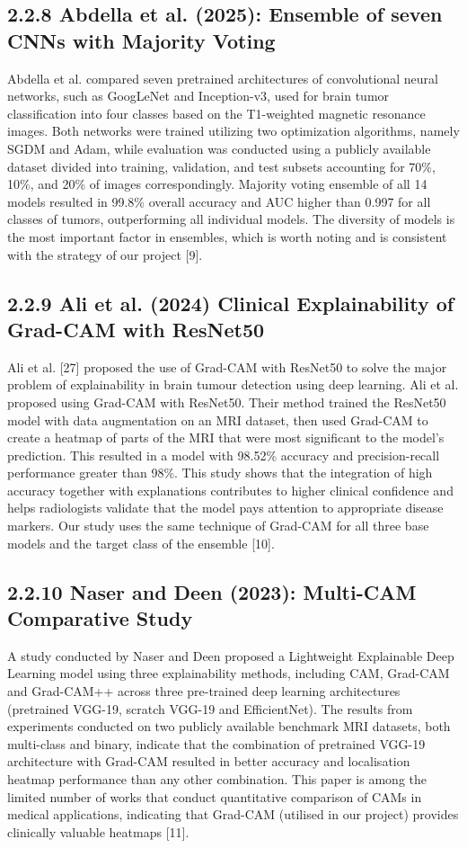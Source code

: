 \documentclass[12pt,a4paper,oneside]{report}
\begin{document}
\subsection{2.2.8 Abdella et al. (2025): Ensemble of seven CNNs with Majority Voting}
Abdella et al. compared seven pretrained architectures of convolutional neural networks, such as GoogLeNet and Inception-v3, used for brain tumor classification into four classes based on the T1-weighted magnetic resonance images. Both networks were trained utilizing two optimization algorithms, namely SGDM and Adam, while evaluation was conducted using a publicly available dataset divided into training, validation, and test subsets accounting for 70\%, 10\%, and 20\% of images correspondingly. Majority voting ensemble of all 14 models resulted in 99.8\% overall accuracy and AUC higher than 0.997 for all classes of tumors, outperforming all individual models. The diversity of models is the most important factor in ensembles, which is worth noting and is consistent with the strategy of our project [9].
\subsection{2.2.9 Ali et al. (2024) Clinical Explainability of Grad-CAM with ResNet50}
Ali et al. [27] proposed the use of Grad-CAM with ResNet50 to solve the major problem of explainability in brain tumour detection using deep learning. Ali et al. proposed using Grad-CAM with ResNet50. Their method trained the ResNet50 model with data augmentation on an MRI dataset, then used Grad-CAM to create a heatmap of parts of the MRI that were most significant to the model's prediction. This resulted in a model with 98.52\% accuracy and precision-recall performance greater than 98\%. This study shows that the integration of high accuracy together with explanations contributes to higher clinical confidence and helps radiologists validate that the model pays attention to appropriate disease markers. Our study uses the same technique of Grad-CAM for all three base models and the target class of the ensemble [10].
\subsection{2.2.10 Naser and Deen (2023): Multi-CAM Comparative Study}
A study conducted by Naser and Deen proposed a Lightweight Explainable Deep Learning model using three explainability methods, including CAM, Grad-CAM and Grad-CAM++ across three pre-trained deep learning architectures (pretrained VGG-19, scratch VGG-19 and EfficientNet). The results from experiments conducted on two publicly available benchmark MRI datasets, both multi-class and binary, indicate that the combination of pretrained VGG-19 architecture with Grad-CAM resulted in better accuracy and localisation heatmap performance than any other combination. This paper is among the limited number of works that conduct quantitative comparison of CAMs in medical applications, indicating that Grad-CAM (utilised in our project) provides clinically valuable heatmaps [11].
\end{document}
